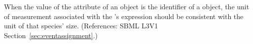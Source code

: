 When the value of the attribute  of an \EventAssignment
object is the identifier of a \Species object, the unit of measurement
associated with the \EventAssignment's  expression should be
consistent with the unit of that species' size.  (References: SBML L3V1
Section~\ref{sec:eventassignment}.)
